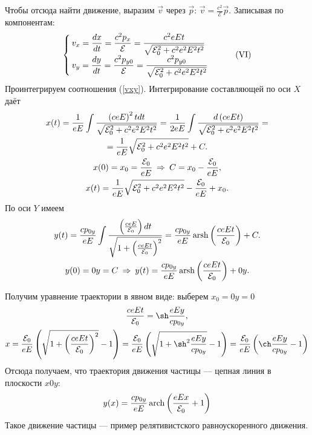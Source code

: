     Чтобы отсюда найти движение, выразим $\vec{v}$ через $\vec{p}$: $\vec{v} = \frac{c^2}{\mathcal{E}}\vec{p}$. Записывая по компонентам:
    \[ \begin{cases}
        \displaystyle v_x = \frac{dx}{dt} = \frac{c^2p_x}{\mathcal{E}} = \frac{c^2eEt}{\sqrt{\mathcal{E}_0^2 + c^2e^2E^2t^2}} \\
        \displaystyle v_y = \frac{dy}{dt} = \frac{c^2p_{y0}}{\mathcal{E}} = \frac{c^2p_{y0}}{\sqrt{\mathcal{E}_0^2 + c^2e^2E^2t^2}}
    \end{cases} \tag{\Romannum{6}}\label{vxy} \]
    Проинтегрируем соотношения (\ref{vxy}). Интегрирование составляющей по оси $X$ даёт
    \begin{gather*}
        x(t) = \frac 1{eE}\int\frac{\left({ceE}\right)^2 tdt}{\sqrt{\mathcal{E}_0^2 + c^2e^2E^2t^2}} =
        \frac 1{2eE}\int\frac{d\left({ceEt}\right)}{\sqrt{\mathcal{E}_0^2 + c^2e^2E^2t^2}} = \\
        = \frac 1{eE} {\sqrt{\mathcal{E}_0^2 + c^2e^2E^2t^2}} + C. \\
        x(0) = x_0 = \frac{\mathcal{E}_0}{eE} \: \Rightarrow \: C = x_0 - \frac{\mathcal{E}_0}{eE}, \\
        x(t) = \frac 1{eE} {\sqrt{\mathcal{E}_0^2 + c^2e^2E^2t^2}} - \frac{\mathcal{E}_0}{eE} + x_0. \\
    \end{gather*}
    По оси $Y$ имеем
    \begin{gather*}
        y(t) = \frac{cp_{0y}}{eE}\int\frac{\left({\frac{ceE}{\mathcal{E}_0}}\right)dt}{\sqrt{1 + \left({\frac{ceEt}{\mathcal{E}_0}}\right)^2}} =
        \frac{cp_{0y}}{eE}\operatorname{arsh}\left({\frac{ceEt}{\mathcal{E}_0}}\right) + C. \\
        y(0) = 0y = C \: \Rightarrow \: y(t) = \frac{cp_{0y}}{eE}\operatorname{arsh}\left({\frac{ceEt}{\mathcal{E}_0}}\right) + 0y.
    \end{gather*}

    Получим уравнение траектории в явном виде: выберем $x_0 = 0y = 0$
    \begin{gather*}
        \frac{ceEt}{\mathcal{E}_0} = \sh\frac{eEy}{cp_{0y}},\\
        x = \frac{\mathcal{E}_0}{eE}\brackets{\sqrt{1 + \brackets{\frac{ceEt}{\mathcal{E}_0}}^2} - 1} =
        \frac{\mathcal{E}_0}{eE} \brackets{\sqrt{1 + \sh^2\frac{eEy}{cp_{0y}}} - 1} =
        \frac{\mathcal{E}_0}{eE} \brackets{\ch\frac{eEy}{cp_{0y}} - 1}
    \end{gather*}
    Отсюда получаем, что траектория движения частицы --- цепная линия в плоскости $x0y$:
    \[
        y(x) = \frac{cp_{0y}}{eE}\operatorname{arch}\left({\frac{eEx}{\mathcal{E}_0} + 1}\right)
    \]
    Такое движение частицы --- пример релятивистского равноускоренного движения.

